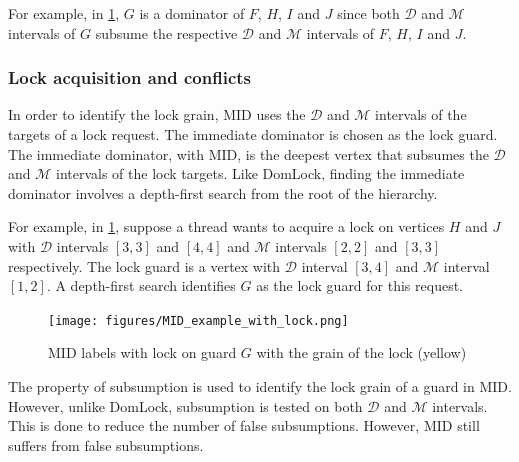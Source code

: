 For example, in \cref{fig:MID_example_locked}, $G$ is a dominator of $F$, $H$, $I$ and $J$ since both $\mathcal{D}$ and $\mathcal{M}$ intervals of $G$ subsume the respective $\mathcal{D}$ and $\mathcal{M}$ intervals of $F$, $H$, $I$ and $J$.

\subsubsection{Lock acquisition and conflicts}
In order to identify the lock grain, MID uses the $\mathcal{D}$ and $\mathcal{M}$ intervals of the targets of a lock request. The immediate dominator is chosen as the lock guard. The immediate dominator, with MID, is the deepest vertex that subsumes the $\mathcal{D}$ and $\mathcal{M}$ intervals of the lock targets. Like DomLock, finding the immediate dominator involves a depth-first search from the root of the hierarchy.

For example, in \cref{fig:MID_example_locked}, suppose a thread wants to acquire a lock on vertices $H$ and $J$ with $\mathcal{D}$ intervals $[3,3]$ and $[4,4]$ and $\mathcal{M}$ intervals $[2,2]$ and $[3,3]$ respectively. The lock guard is a vertex with $\mathcal{D}$ interval $[3,4]$ and $\mathcal{M}$ interval $[1,2]$. A depth-first search identifies $G$ as the lock guard for this request. 


\begin{figure}[H]
    \centering
    \captionsetup{justification=centering}
    \texttt{[image: figures/MID\_example\_with\_lock.png]}
    \caption{MID labels with lock on guard $G$ with the grain of the lock (yellow)}
    \label{fig:MID_example_locked}
\end{figure}


The property of subsumption is used to identify the lock grain of a guard in MID. However, unlike DomLock, subsumption is tested on both $\mathcal{D}$ and $\mathcal{M}$ intervals. 
This is done to reduce the number of false subsumptions. However, MID still suffers from false subsumptions.


